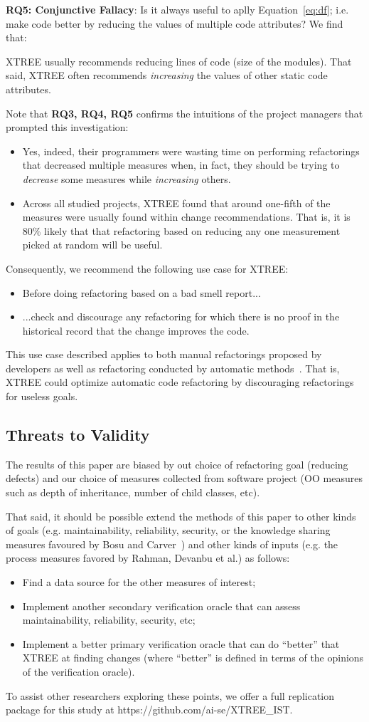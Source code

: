 \documentclass[twocolumn,5p]{elsarticle}
\newcommand{\bi}{\begin{itemize}[leftmargin=0.4cm]}
\newcommand{\ei}{\end{itemize}}
\newcommand{\eq}[1]{Equation~\ref{eq:#1}}
\theoremstyle{break}
\begin{document}
{\bf RQ5: Conjunctive Fallacy}:  
Is it always  useful  to aplly \eq{df}; i.e. make code better by   reducing the values of  multiple code attributes? We find that:
\begin{lesson}
XTREE usually recommends reducing lines of code (size of the modules).
That said,  XTREE often recommends {\em increasing} the values of other static code attributes.
\end{lesson} 
Note that {\bf RQ3, RQ4, RQ5} 
confirms the intuitions
of the project managers that prompted this investigation:
\bi
\item
Yes,  indeed, their programmers
were wasting time on   performing refactorings  that  decreased multiple measures when, in fact,
they should be trying to {\em decrease} some measures while {\em increasing} others.
\item
Across all studied projects, XTREE found that  around one-fifth  
  of the measures were usually found within  change recommendations. That is, it is 80\% likely that
  that refactoring based on reducing any one measurement picked at random will be useful.
\ei
Consequently, we  recommend the following use case for  XTREE:
\bi
\item Before doing  refactoring based on a bad smell report...
\item ...check and discourage any refactoring   for which there is no proof
  in the historical record that the change improves the code.
\ei
This use case described  applies to both manual refactorings proposed by developers
as well as refactoring conducted by automatic methods~\cite{mkaouer2015many}. That is, XTREE could optimize automatic
code refactoring by discouraging refactorings for useless goals.
 


\subsection{ Threats to Validity}
 
The results of this paper are biased by out choice of refactoring goal (reducing defects) and our choice
of measures collected from software project (OO measures such as
  depth of inheritance, number of child classes, etc).
  
  That said, it should be possible extend the methods of this paper to other kinds of goals (e.g. maintainability, reliability, security,
  or the knowledge sharing measures favoured by Bosu and Carver~\cite{bosu13}) and other kinds of inputs (e.g. the process measures favored by Rahman, Devanbu et al.\cite{Rahman2013})  as follows:
  \bi
  \item Find a data source for the other measures of interest;
  \item Implement another secondary verification oracle that can assess maintainability, reliability, security, etc;
\item Implement a better primary verification oracle that can do ``better'' that XTREE at finding changes (where ``better'' is defined in terms 
of the opinions of the verification oracle).
\ei
To assist other researchers exploring these points, we offer a full replication package for this study at  https://github.com/ai-se/XTREE\_IST.
\end{document}
